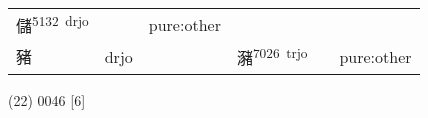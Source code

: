 \documentclass[14pt,a4paper]{scrartcl}
\begin{document}
\begin{longtable}[c]{@{}llllll@{}}
\begin{minipage}[t]{0.14\columnwidth}
儲\textsuperscript{5132~drjo}
\strut\end{minipage} &
\begin{minipage}[t]{0.14\columnwidth}\raggedright\strut
\strut\end{minipage} &
\begin{minipage}[t]{0.14\columnwidth}\raggedright\strut
pure:other
\strut\end{minipage}\tabularnewline
\begin{minipage}[t]{0.14\columnwidth}\raggedright\strut
豬
\strut\end{minipage} &
\begin{minipage}[t]{0.14\columnwidth}\raggedright\strut
drjo
\strut\end{minipage} &
\begin{minipage}[t]{0.14\columnwidth}\raggedright\strut
\strut\end{minipage} &
\begin{minipage}[t]{0.14\columnwidth}\raggedright\strut
瀦\textsuperscript{7026~trjo}
\strut\end{minipage} &
\begin{minipage}[t]{0.14\columnwidth}\raggedright\strut
\strut\end{minipage} &
\begin{minipage}[t]{0.14\columnwidth}\raggedright\strut
pure:other
\strut\end{minipage}\tabularnewline
\bottomrule
\end{longtable}

(22) 0046 {[}6{]}
\end{document}
